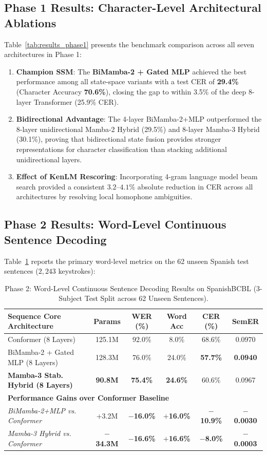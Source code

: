 \documentclass[conference]{IEEEtran}
\begin{document}
\subsection{Phase 1 Results: Character-Level Architectural Ablations}
Table~\ref{tab:results_phase1} presents the benchmark comparison across all seven architectures in Phase 1:
\begin{enumerate}
    \item \textbf{Champion SSM}: The \textbf{BiMamba-2 + Gated MLP} achieved the best performance among all state-space variants with a test CER of \textbf{29.4\%} (Character Accuracy \textbf{70.6\%}), closing the gap to within 3.5\% of the deep 8-layer Transformer (25.9\% CER).
    \item \textbf{Bidirectional Advantage}: The 4-layer BiMamba-2+MLP outperformed the 8-layer unidirectional Mamba-2 Hybrid (29.5\%) and 8-layer Mamba-3 Hybrid (30.1\%), proving that bidirectional state fusion provides stronger representations for character classification than stacking additional unidirectional layers.
    \item \textbf{Effect of KenLM Rescoring}: Incorporating 4-gram language model beam search provided a consistent $3.2\text{--}4.1\%$ absolute reduction in CER across all architectures by resolving local homophone ambiguities.
\end{enumerate}

\subsection{Phase 2 Results: Word-Level Continuous Sentence Decoding}
Table~\ref{tab:results_phase2} reports the primary word-level metrics on the 62 unseen Spanish test sentences ($2,243$ keystrokes):

\begin{table}[t]
\centering
\caption{Phase 2: Word-Level Continuous Sentence Decoding Results on SpanishBCBL (3-Subject Test Split across 62 Unseen Sentences).}
\label{tab:results_phase2}
\begin{tabular}{@{}lccccc@{}}
\toprule
\textbf{Sequence Core Architecture} & \textbf{Params} & \textbf{WER (\%)} & \textbf{Word Acc} & \textbf{CER (\%)} & \textbf{SemER} \\
\midrule
Conformer (8 Layers) & 125.1M & 92.0\% & 8.0\% & 68.6\% & 0.0970 \\
BiMamba-2 + Gated MLP (8 Layers) & 128.3M & 76.0\% & 24.0\% & \textbf{57.7\%} & \textbf{0.0940} \\
\textbf{Mamba-3 Stab. Hybrid (8 Layers)} & \textbf{90.8M} & \textbf{75.4\%} & \textbf{24.6\%} & 60.6\% & 0.0967 \\
\midrule
\multicolumn{6}{l}{\textbf{Performance Gains over Conformer Baseline}} \\
\textit{BiMamba-2+MLP vs. Conformer} & +3.2M & \textbf{$-$16.0\%} & \textbf{$+$16.0\%} & \textbf{$-$10.9\%} & \textbf{$-$0.0030} \\
\textit{Mamba-3 Hybrid vs. Conformer} & \textbf{$-$34.3M} & \textbf{$-$16.6\%} & \textbf{$+$16.6\%} & \textbf{$-$8.0\%} & \textbf{$-$0.0003} \\
\bottomrule
\end{tabular}
\end{table}
\end{document}

